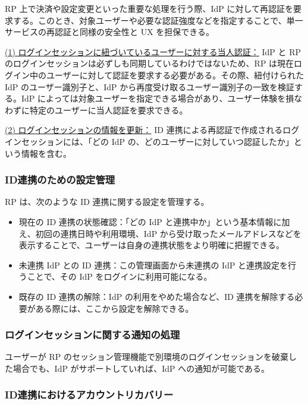 \documentclass[uplatex]{jsarticle}
\begin{document}
RP 上で決済や設定変更といった重要な処理を行う際、IdP に対して再認証を要求する。このとき、対象ユーザーや必要な認証強度などを指定することで、単一サービスの再認証と同様の安全性と UX を担保できる。

\underline{(1) ログインセッションに紐づいているユーザーに対する当人認証：}
IdP と RP のログインセッションは必ずしも同期しているわけではないため、RP は現在ログイン中のユーザーに対して認証を要求する必要がある。その際、紐付けられた IdP のユーザー識別子と、IdP から再度受け取るユーザー識別子の一致を検証する。IdP によっては対象ユーザーを指定できる場合があり、ユーザー体験を損なわずに特定のユーザーに当人認証を要求できる。

\underline{(2) ログインセッションの情報を更新：}
ID 連携による再認証で作成されるログインセッションには、「どの IdP の、どのユーザーに対していつ認証したか」という情報を含む。

\subsubsection{ID連携のための設定管理}

RP は、次のような ID 連携に関する設定を管理する。
\begin{itemize}
\item 現在の ID 連携の状態確認：「どの IdP と連携中か」という基本情報に加え、初回の連携日時や利用環境、IdP から受け取ったメールアドレスなどを表示することで、ユーザーは自身の連携状態をより明確に把握できる。
\item 未連携 IdP との ID 連携：この管理画面から未連携の IdP と連携設定を行うことで、その IdP をログインに利用可能になる。
\item 既存の ID 連携の解除：IdP の利用をやめた場合など、ID 連携を解除する必要がある際には、ここから設定を解除できる。
\end{itemize}

\subsubsection{ログインセッションに関する通知の処理}

ユーザーが RP のセッション管理機能で別環境のログインセッションを破棄した場合でも、IdP がサポートしていれば、IdP への通知が可能である。

\subsubsection{ID連携におけるアカウントリカバリー}
\end{document}
